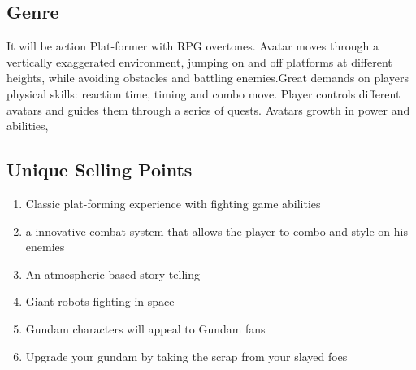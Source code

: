\documentclass{article}
\begin{document}
\subsection*{Genre}
It will be action Plat-former with RPG overtones. Avatar moves through a vertically exaggerated environment, jumping on and off platforms at different heights, while avoiding obstacles and battling enemies.Great demands on players physical skills: reaction time, timing and combo move.
Player controls different avatars and guides them through a series of quests. Avatars growth in power and abilities,

\subsection*{Unique Selling Points}
    \begin{enumerate}
        \item Classic plat-forming experience with fighting game abilities 
        \item a innovative combat system that allows the player to combo and style on his enemies
        \item An atmospheric based story telling
        \item Giant robots fighting in space
        \item Gundam characters will appeal to Gundam fans
        \item Upgrade your gundam by taking the scrap from your slayed foes 
    \end{enumerate}
\end{document}
